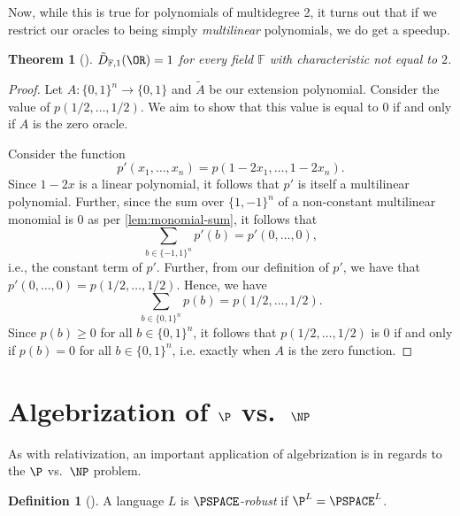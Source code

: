 \documentclass[english]{reedthesis}
\theoremstyle{plain}
\newtheorem{thm}{Theorem}[section]
\theoremstyle{definition}
\newtheorem{defn}[defn]{Definition}
\theoremstyle{remark}
\begin{document}
Now, while this is true for polynomials of multidegree 2, it turns out that if
we restrict our oracles to being simply \emph{multilinear} polynomials, we do
get a speedup.

\begin{thm}[{\cite[Thm. 3]{JKRS09}}]\label{thm:or-multilinear}
  $\tilde{D}_{\mathbb{F},1}(\OR) = 1$ for every field $\mathbb{F}$ with
  characteristic not equal to $2$.
\end{thm}

\begin{proof}
  Let $A: \{0, 1\}^{n} \rightarrow \{0, 1\}$ and $\tilde{A}$ be our extension polynomial.
  Consider the value of $p(1/2, \ldots, 1/2)$. We aim to show that this value is
  equal to $0$ if and only if $A$ is the zero oracle.

  Consider the function
  \begin{equation}
    p'(x_{1}, \ldots, x_{n}) = p(1 - 2x_{1}, \ldots, 1 - 2x_{n}).
  \end{equation}
  Since $1 - 2x$ is a linear polynomial, it follows that $p'$ is itself a
  multilinear polynomial. Further, since the sum over $\{1, -1\}^{n}$ of a
  non-constant multilinear monomial is 0 as per \cref{lem:monomial-sum}, it
  follows that
  \begin{equation}
    \sum_{b \in \{-1, 1\}^{n}}p'(b) = p'(0, \ldots, 0),
  \end{equation}
  i.e., the constant term of $p'$. Further, from our definition of $p'$, we have
  that $p'(0, \ldots, 0) = p(1/2, \ldots, 1/2)$. Hence, we have
  \begin{equation}
    \sum_{b \in \{0, 1\}^{n}}p(b) = p(1/2, \ldots, 1/2).
  \end{equation}
  Since $p(b) \ge 0$ for all $b \in \{0, 1\}^{n}$, it follows that $p(1/2, \ldots, 1/2)$
  is 0 if and only if $p(b) = 0$ for all $b \in \{0, 1\}^{n}$, i.e. exactly when
  $A$ is the zero function.
\end{proof}


\section{Algebrization of $\P$ vs.\ $\NP$}\label{sec:alg-p-np}

As with relativization, an important application of algebrization is in regards
to the $\P$ vs.\ $\NP$ problem.

\begin{defn}[{\cite[Def.\ 6.1]{BFL90}}]\label{def:pspace-robust}
  A language $L$ is \emph{$\PSPACE$-robust} if $\P^{L} = \PSPACE^{L}$.
\end{defn}
\end{document}
